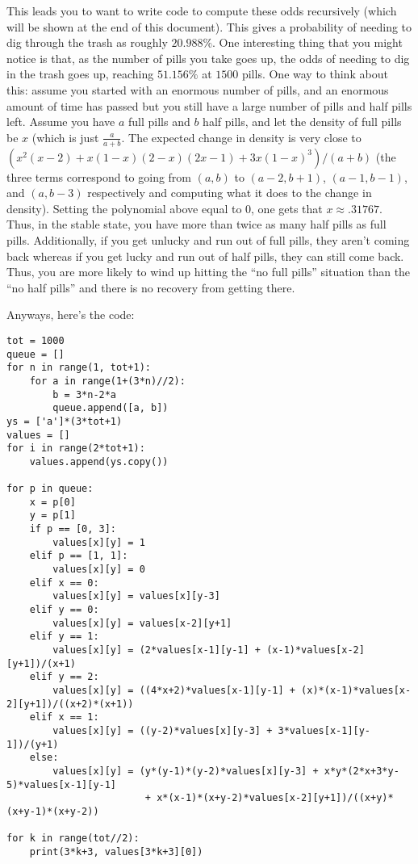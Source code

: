 \documentclass[11pt]{article}
\theoremstyle{definition}
\begin{document}
This leads you to want to write code to compute these odds recursively (which will be shown at the end of this document).  This gives a probability of needing to dig through the trash as roughly $20.988\%$.  One interesting thing that you might notice is that, as the number of pills you take goes up, the odds of needing to dig in the trash goes up, reaching $51.156\%$ at $1500$ pills.  One way to think about this: assume you started with an enormous number of pills, and an enormous amount of time has passed but you still have a large number of pills and half pills left.  Assume you have $a$ full pills and $b$ half pills, and let the density of full pills be $x$ (which is just $\frac{a}{a+b}$.  The expected change in density is very close to $(x^2(x-2) + x(1-x)(2-x)(2x-1) + 3x(1-x)^3)/(a+b)$ (the three terms correspond to going from $(a, b)$ to $(a-2, b+1)$, $(a-1, b-1)$, and $(a, b-3)$ respectively and computing what it does to the change in density).  Setting the polynomial above equal to $0$, one gets that $x \approx  .31767$.  Thus, in the stable state, you have more than twice as many half pills as full pills.  Additionally, if you get unlucky and run out of full pills, they aren't coming back whereas if you get lucky and run out of half pills, they can still come back.  Thus, you are more likely to wind up hitting the ``no full pills'' situation than the ``no half pills'' and there is no recovery from getting there.

Anyways, here's the code:
\begin{verbatim}
tot = 1000
queue = []
for n in range(1, tot+1):
    for a in range(1+(3*n)//2):
        b = 3*n-2*a
        queue.append([a, b])
ys = ['a']*(3*tot+1)
values = []
for i in range(2*tot+1):
    values.append(ys.copy())

for p in queue:
    x = p[0]
    y = p[1]
    if p == [0, 3]:
        values[x][y] = 1
    elif p == [1, 1]:
        values[x][y] = 0
    elif x == 0:
        values[x][y] = values[x][y-3]
    elif y == 0:
        values[x][y] = values[x-2][y+1]
    elif y == 1:
        values[x][y] = (2*values[x-1][y-1] + (x-1)*values[x-2][y+1])/(x+1)
    elif y == 2:
        values[x][y] = ((4*x+2)*values[x-1][y-1] + (x)*(x-1)*values[x-2][y+1])/((x+2)*(x+1))
    elif x == 1:
        values[x][y] = ((y-2)*values[x][y-3] + 3*values[x-1][y-1])/(y+1) 
    else:
        values[x][y] = (y*(y-1)*(y-2)*values[x][y-3] + x*y*(2*x+3*y-5)*values[x-1][y-1]
                        + x*(x-1)*(x+y-2)*values[x-2][y+1])/((x+y)*(x+y-1)*(x+y-2))
        
for k in range(tot//2):
    print(3*k+3, values[3*k+3][0])
\end{verbatim}
\end{document}
